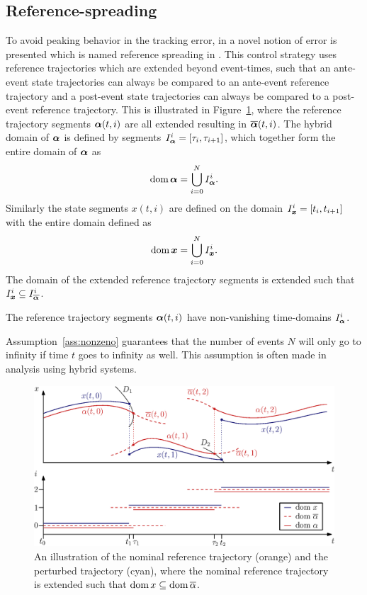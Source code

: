 \documentclass[../DC2017114Bouma.tex]{subfiles}
\begin{document}
\subsection{Reference-spreading}
To avoid peaking behavior in the tracking error, in \cite{Saccon2014} a novel notion of error is presented which is named reference spreading in \cite{Rijnen2016}. This control strategy uses reference trajectories which are extended beyond event-times, such that an ante-event state trajectories can always be compared to an ante-event reference trajectory and a post-event state trajectories can always be compared to a post-event reference trajectory. This is illustrated in Figure~\ref{fig:3refspread}, where the reference trajectory segments $\boldsymbol{\alpha}(t,i)$ are all extended resulting in $\overline{\boldsymbol{\alpha}}(t,i)$. The hybrid domain \cite{Goebel2009} of $\boldsymbol{\alpha}$ is defined by segments $I^i_{\boldsymbol{\alpha}} = [\tau_i,\tau_{i+1}]$, which together form the entire domain of $\boldsymbol{\alpha}$ as
\begin{align}
\operatorname{\textnormal{dom}}\boldsymbol{\alpha} = \bigcup^N_{i=0}I_{\boldsymbol{\alpha}}^i.
\end{align}
Similarly the state segments $x(t,i)$ are defined on the domain $I^i_{\boldsymbol{x}} = [t_i,t_{i+1}]$ with the entire domain defined as
\begin{align}
\operatorname{\textnormal{dom}}{\boldsymbol{x}} = \bigcup^N_{i=0}I_{{\boldsymbol{x}}}^i.
\end{align}
The domain of the extended reference trajectory segments is extended such that $I_{{\boldsymbol{x}}}^i\subseteq I_{\overline{\boldsymbol{\alpha}}}^i$.

\begin{myass}
The reference trajectory segments $\boldsymbol{\alpha}(t,i)$ have non-vanishing time-domains $I_{\boldsymbol{\alpha}}^i$.\label{ass:nonzeno}
\end{myass}

Assumption~\ref{ass:nonzeno} guarantees that the number of events $N$ will only go to infinity if time $t$ goes to infinity as well. This assumption is often made in analysis using hybrid systems.

\begin{figure}[h]
\centering
\includegraphics[width=.8\textwidth]{refspreaddom.eps}\caption{An illustration of the nominal reference trajectory (orange) and the perturbed trajectory (cyan), where the nominal reference trajectory is extended such that $\operatorname{\textnormal{dom}} x\subseteq\operatorname{\textnormal{dom}} \overline{\alpha}$.} \label{fig:3refspread}
\end{figure}
\end{document}
